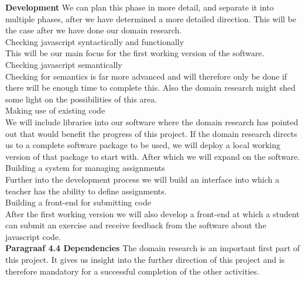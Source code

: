 \documentclass{article}
\begin{document}
\noindent
\textbf{Development}
\newline
We can plan this phase in more detail, and separate it into multiple phases, after we have determined a more detailed direction. This will be the case after we have done our domain research.\\
\newline
Checking javascript syntactically and functionally\\
This will be our main focus for the first working version of the software.\\
Checking javascript semantically\\
Checking for semantics is far more advanced and will therefore only be done if there will be enough time to complete this. Also the domain research might shed some light on the possibilities of this area.\\
Making use of existing code\\
We will include libraries into our software where the domain research has pointed out that would benefit the progress of this project. If the domain research directs us to a complete software package to be used, we will deploy a local working version of that package to start with. After which we will expand on the software.\\
Building a system for managing assignments\\
Further into the development process we will build an interface into which a teacher has the ability to define assignments.\\
Building a front-end for submitting code\\
After the first working version we will also develop a front-end at which a student can submit an exercise and receive feedback from the software about the javascript code.\\

\noindent
\textbf{Paragraaf 4.4 Dependencies}
The domain research is an important first part of this project. It gives us insight into the further direction of this project and is therefore mandatory for a successful completion of the other activities.
\newline
\newline
\end{document}
